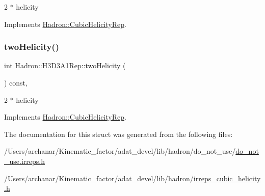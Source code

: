 2 $\ast$ helicity 

Implements \mbox{\hyperlink{structHadron_1_1CubicHelicityRep_af507aa56fc2747eacc8cb6c96db31ecc}{Hadron\+::\+Cubic\+Helicity\+Rep}}.

\mbox{\label{structHadron_1_1H3D3A1Rep_a6224faf1aafe58abef4151638b0ccacb}} 
\subsubsection{\texorpdfstring{twoHelicity()}{twoHelicity()}\hspace{0.1cm}{\footnotesize\ttfamily [2/2]}}
{\footnotesize\ttfamily int Hadron\+::\+H3\+D3\+A1\+Rep\+::two\+Helicity (\begin{DoxyParamCaption}{ }\end{DoxyParamCaption}) const\hspace{0.3cm}{\ttfamily [inline]}, {\ttfamily [virtual]}}

2 $\ast$ helicity 

Implements \mbox{\hyperlink{structHadron_1_1CubicHelicityRep_af507aa56fc2747eacc8cb6c96db31ecc}{Hadron\+::\+Cubic\+Helicity\+Rep}}.



The documentation for this struct was generated from the following files\+:\begin{DoxyCompactItemize}
\item 
/\+Users/archanar/\+Kinematic\+\_\+factor/adat\+\_\+devel/lib/hadron/do\+\_\+not\+\_\+use/\mbox{\hyperlink{do__not__use_8irreps_8h}{do\+\_\+not\+\_\+use.\+irreps.\+h}}\item 
/\+Users/archanar/\+Kinematic\+\_\+factor/adat\+\_\+devel/lib/hadron/\mbox{\hyperlink{lib_2hadron_2irreps__cubic__helicity_8h}{irreps\+\_\+cubic\+\_\+helicity.\+h}}\end{DoxyCompactItemize}
